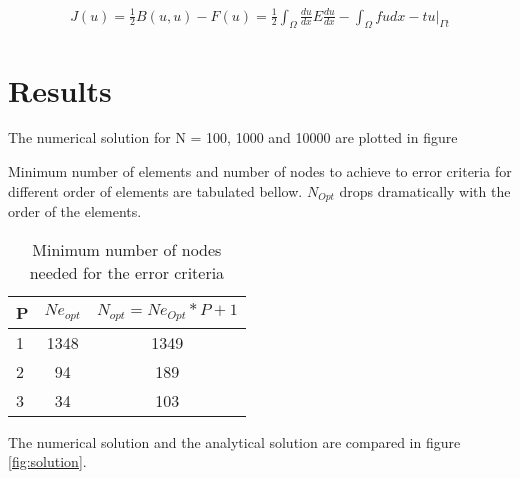 \documentclass[paper=a4, fontsize=11pt]{article} %
\begin{document}
\begin{eqnarray}
J(u) = \frac{1}{2} B(u, u) - F(u) = \frac{1}{2} \int_{\Omega} \frac{du}{dx} E \frac{du}{dx} - \int_{\Omega} fu dx - tu |_{\Gamma t}
\end{eqnarray}


\section{Results}

The numerical solution for N = 100, 1000 and 10000 are plotted in figure

Minimum number of elements and number of nodes to achieve to error criteria for different order of elements are tabulated bellow. $N_{Opt}$ drops dramatically with the order of the elements. 

\begin{table}
\begin{center}
  \begin{tabular}{ l | c | c}
    \hline
    P & $Ne_{opt}$ & $N_{opt} = Ne_{Opt} * P + 1 $\\ \hline
    1 & 1348 & 1349\\ \hline
    2 &  94 & 189\\ \hline
    3 & 34 & 103\\ \hline
    \hline
  \end{tabular}
  \caption{Minimum number of nodes needed for the error criteria}
\end{center}
\end{table}

The numerical solution and the analytical solution are compared in figure \ref{fig:solution}. 


        
\end{document}
